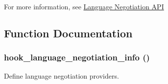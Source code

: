 For more information, see \hyperlink{}{Language Negotiation API } 

\subsection{Function Documentation}
\hypertarget{group__language__negotiation_gabcac4b239272ba30c6320a0af2fab46e}{
\subsubsection[{hook\_\-language\_\-negotiation\_\-info}]{\setlength{\rightskip}{0pt plus 5cm}hook\_\-language\_\-negotiation\_\-info ()}}
\label{group__language__negotiation_gabcac4b239272ba30c6320a0af2fab46e}
Define language negotiation providers.

